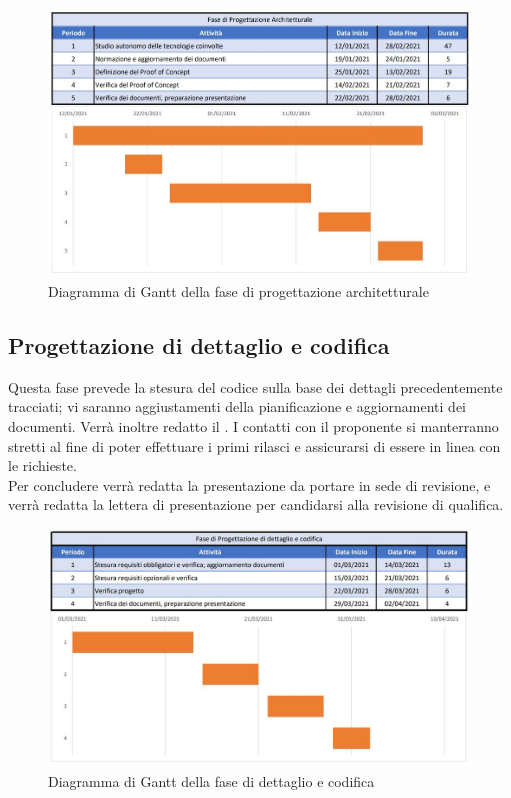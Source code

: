\documentclass[../piano_di_progetto.tex]{subfiles}
\begin{document}
\begin{figure}[H]
\centering

\includegraphics[width=12cm]{componenti/img/fase_prog_archit}

\caption{Diagramma di Gantt della fase di progettazione architetturale}
\end{figure}


\subsection{Progettazione di dettaglio e codifica}%
\label{sub:prog_dett}
Questa fase prevede la stesura del codice sulla base dei dettagli precedentemente tracciati; vi saranno aggiustamenti della pianificazione e aggiornamenti dei documenti. Verrà inoltre redatto il . I contatti con il proponente si manterranno stretti al fine di poter effettuare i primi rilasci e assicurarsi di essere in linea con le richieste.\\
Per concludere verrà redatta la presentazione da portare in sede di revisione, e verrà redatta la lettera di presentazione per candidarsi alla revisione di qualifica. 

\begin{figure}[H]
\centering

\includegraphics[width=12cm]{componenti/img/fase_dett_cod}

\caption{Diagramma di Gantt della fase di dettaglio e codifica}
\end{figure}
\end{document}
